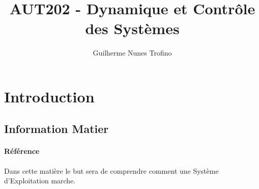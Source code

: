 \documentclass{article}
\title{AUT202 - Dynamique et Contrôle des Systèmes}
\author{Guilherme Nunes Trofino}
\begin{document}
\maketitle
\setlength{\parindent}{0pt}

\newpage\tableofcontents

\section{Introduction}


\subsection{Information Matier}
\paragraph{Référence}Dans cette matière le but sera de comprendre comment une Système d'Exploitation marche.







\end{document}
